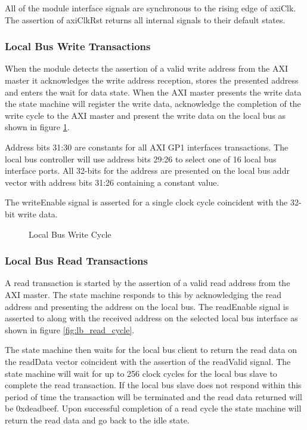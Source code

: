 \documentclass[11pt]{article}
\begin{document}
All of the module interface signals are synchronous to the rising edge of axiClk.  The assertion of axiClkRst returns all internal signals to their default states.

\subsubsection{Local Bus Write Transactions}

When the module detects the assertion of a valid write address from the AXI master it acknowledges the write address reception, stores the presented 
address and enters the wait for data state.  When the AXI master presents the write data the state machine will register the write data, acknowledge 
the completion of the write cycle to the AXI master and present the write data on the local bus as shown in figure \ref{fig:lb_write_cycle}.

Address bits 31:30 are constants for all AXI GP1 interfaces transactions. The local bus controller will use address bits 29:26 to select one of
16 local bus interface ports. All 32-bits for the address are presented on the local bus addr vector with address bits 31:26 containing a constant
value.

The writeEnable signal is asserted for a single clock cycle coincident with the 32-bit write data. 

\begin{figure}[H]
   \centering
   \caption{Local Bus Write Cycle}
   \label{fig:lb_write_cycle}
\end{figure}

\subsubsection{Local Bus Read Transactions}

A read transaction is started by the assertion of a valid read address from the AXI master. The state machine responds to this by 
acknowledging the read address and presenting the address on the local bus. The readEnable signal is asserted to along with the 
received address on the selected local bus interface as shown in figure \ref{fig:lb_read_cycle}. 

The state machine then waits for the local bus client to return the read data on the readData vector coincident with the assertion 
of the readValid signal. The state machine will wait for up to 256 clock cycles for the local bus slave to complete the read transaction. 
If the local bus slave does not respond within this period of time the transaction will be terminated and the read data returned will be 
0xdeadbeef. Upon successful completion of a read cycle the state machine will return the read data and go back to the idle state. 
\end{document}

